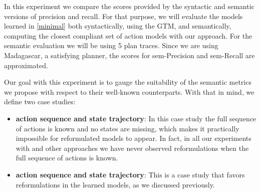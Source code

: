 In this experiment we compare the scores provided by the syntactic and semantic versions of precision and recall. For that purpose, we will evaluate the models learned in \ref{minimal} both syntactically, using the GTM, and semantically, computing the closest compliant set of action models with our approach. For the semantic evaluation we will be using 5 plan traces. Since we are using {\sc Madagascar}, a satisfying planner, the scores for sem-Precision and sem-Recall are approximated.

Our goal with this experiment is to gauge the suitability of the semantic metrics we propose with respect to their well-known counterparts. With that in mind, we define two case studies:

\begin{itemize}
	\item \textbf{\FO action sequence and \PO state trajectory}: In this case study the full sequence of actions is known and no states are missing, which makes it practically impossible for reformulated models to appear. In fact, in all our experiments with \FAMA and other approaches we have never observed reformulations when the full sequence of actions is known.
	\item  \textbf{\NO action sequence and \NO state trajectory}: This is a case study that favors reformulations in the learned models, as we discussed previously.
\end{itemize}


